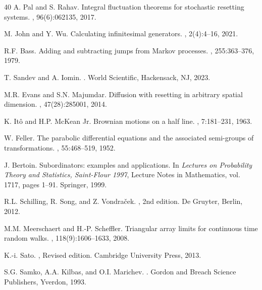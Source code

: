 \documentclass[11pt,a4paper]{article}
\theoremstyle{definition}
\theoremstyle{remark}
\begin{document}
\begin{thebibliography}{40}
	A. Pal and S. Rahav.
	\newblock Integral fluctuation theorems for stochastic resetting systems.
	, 96(6):062135, 2017.
	
	M. John and Y. Wu.
	\newblock Calculating infinitesimal generators.
	, 2(4):4--16, 2021.
	
	R.F. Bass.
	\newblock Adding and subtracting jumps from Markov processes.
	, 255:363--376, 1979.
	
	T. Sandev and A. Iomin.
	.
	\newblock World Scientific, Hackensack, NJ, 2023.
	
	M.R. Evans and S.N. Majumdar.
	\newblock Diffusion with resetting in arbitrary spatial dimension.
	, 47(28):285001, 2014.
	
	K. Itô and H.P. McKean Jr.
	\newblock Brownian motions on a half line.
	, 7:181--231, 1963.
	
	W. Feller.
	\newblock The parabolic differential equations and the associated semi-groups of transformations.
	, 55:468--519, 1952.
	
	J. Bertoin.
	\newblock Subordinators: examples and applications.
	\newblock In {\em Lectures on Probability Theory and Statistics, Saint-Flour 1997}, Lecture Notes in Mathematics, vol. 1717, pages 1--91. Springer, 1999.
	
	R.L. Schilling, R. Song, and Z. Vondraček.
	, 2nd edition.
	\newblock De Gruyter, Berlin, 2012.
	
	M.M. Meerschaert and H.-P. Scheffler.
	\newblock Triangular array limits for continuous time random walks.
	, 118(9):1606--1633, 2008.
	
	K.-i. Sato.
	, Revised edition.
	\newblock Cambridge University Press, 2013.
	
	S.G. Samko, A.A. Kilbas, and O.I. Marichev.
	.
	\newblock Gordon and Breach Science Publishers, Yverdon, 1993.
	

\end{thebibliography}
\end{document}
